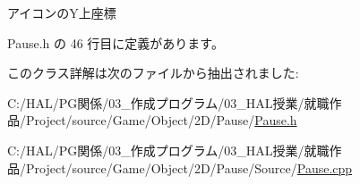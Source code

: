 アイコンの\+Y上座標 



 Pause.\+h の 46 行目に定義があります。



このクラス詳解は次のファイルから抽出されました\+:\begin{DoxyCompactItemize}
\item 
C\+:/\+H\+A\+L/\+P\+G関係/03\+\_\+作成プログラム/03\+\_\+\+H\+A\+L授業/就職作品/\+Project/source/\+Game/\+Object/2\+D/\+Pause/\mbox{\hyperlink{_pause_8h}{Pause.\+h}}\item 
C\+:/\+H\+A\+L/\+P\+G関係/03\+\_\+作成プログラム/03\+\_\+\+H\+A\+L授業/就職作品/\+Project/source/\+Game/\+Object/2\+D/\+Pause/\+Source/\mbox{\hyperlink{_pause_8cpp}{Pause.\+cpp}}\end{DoxyCompactItemize}
